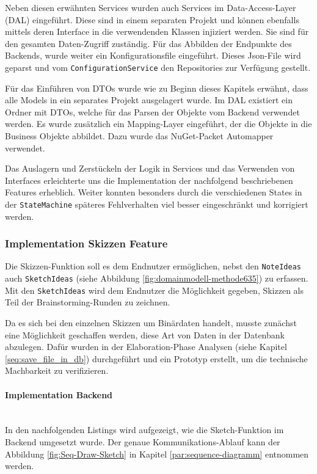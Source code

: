 Neben diesen erwähnten Services wurden auch Services im Data-Access-Layer (DAL) eingeführt. Diese sind in einem separaten Projekt und können ebenfalls mittels deren Interface in die verwendenden Klassen injiziert werden. Sie sind für den gesamten Daten-Zugriff zuständig. Für das Abbilden der Endpunkte des Backends, wurde weiter ein Konfigurationsfile eingeführt. Dieses Json-File wird geparst und vom \texttt{ConfigurationService} den Repositories zur Verfügung gestellt. 

Für das Einführen von DTOs wurde wie zu Beginn dieses Kapitels erwähnt, dass alle Models in ein separates Projekt ausgelagert wurde. Im DAL existiert ein Ordner mit DTOs, welche für das Parsen der Objekte vom Backend verwendet werden. Es wurde zusätzlich ein Mapping-Layer eingeführt, der die Objekte in die Business Objekte abbildet. Dazu wurde das NuGet-Packet Automapper verwendet. 

Das Auslagern und Zerstückeln der Logik in Services und das Verwenden von Interfaces erleichterte uns die Implementation der nachfolgend beschriebenen Features erheblich. Weiter konnten besonders durch die verschiedenen States in der \texttt{StateMachine} späteres Fehlverhalten viel besser eingeschränkt und korrigiert werden. 

\subsubsection{Implementation Skizzen Feature}
Die Skizzen-Funktion soll es dem Endnutzer ermöglichen, nebst den \texttt{NoteIdeas} auch \texttt{SketchIdeas} (siehe Abbildung \ref{fig:domainmodell-methode635}) zu erfassen. Mit den \texttt{SketchIdeas} wird dem Endnutzer die Möglichkeit gegeben, Skizzen als Teil der Brainstorming-Runden zu zeichnen.

Da es sich bei den einzelnen Skizzen um Binärdaten handelt, musste zunächst eine Möglichkeit geschaffen werden, diese Art von Daten in der Datenbank abzulegen. Dafür wurden in der Elaboration-Phase Analysen (siehe Kapitel \ref{seq:save_file_in_db}) durchgeführt und ein Prototyp erstellt, um die technische Machbarkeit zu verifizieren.

\paragraph*{Implementation Backend}~\\
In den nachfolgenden Listings wird aufgezeigt, wie die Sketch-Funktion im Backend umgesetzt wurde.
Der genaue Kommunikations-Ablauf kann der Abbildung \ref{fig:Seq-Draw-Sketch} in Kapitel \ref{par:sequence-diagramm} entnommen werden.

